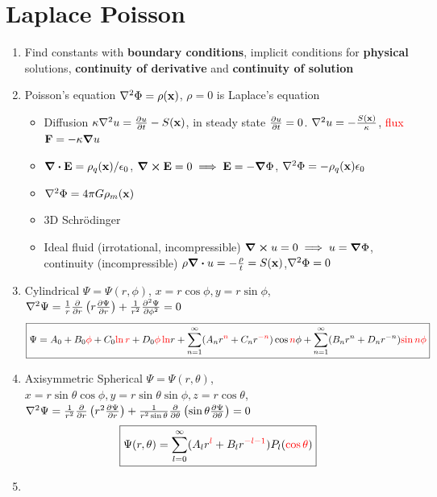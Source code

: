 \documentclass{article}
\theoremstyle{remark}
\theoremstyle{remark}
\begin{document}
    \section*{Laplace Poisson}
    \begin{enumerate}
        \item Find constants with \textbf{boundary conditions}, implicit conditions for \textbf{physical} solutions, \textbf{continuity of derivative} and \textbf{continuity of solution}
        \item Poisson's equation $\laplacian\Phi=\rho(\vb{x})$, $\rho=0$ is Laplace's equation\begin{itemize}
            \item Diffusion $\kappa\laplacian u=\pdv{u}{t}-S(\vb{x})$, in steady state $\pdv{u}{t}=0$. $\laplacian{u}=-\frac{S(\vb{x})}{\kappa}$, \textcolor{red}{flux $\vb{F}=-\kappa\grad u$}
            \item $\div\vb{E}=\rho_q(\vb{x})/\epsilon_0$, $\curl\vb{E}=0\implies\vb{E}=-\grad\Phi$, $\laplacian{\Phi}=-\rho_q(\vb{x})\epsilon_0$
            \item $\laplacian{\Phi}=4\pi G\rho_m(\vb{x})$
            \item 3D Schr\"odinger
            \item Ideal fluid (irrotational, incompressible) $\curl u=0\implies u=\grad\Phi$, continuity (incompressible) $\rho\div u=-\frac{\rho}{t}=S(\vb{x})$,$\laplacian{\Phi}=0$
        \end{itemize}
        \item Cylindrical $\Psi = \Psi(r,\phi)$, $x=r\cos\phi,y=r\sin\phi$, $\laplacian{\Psi}=\frac{1}{r}\pdv{r}\left(r\pdv{\Psi}{r}\right)+\frac{1}{r^2}\pdv[2]{\Psi}{\phi}=0$\[
            \boxed{\Psi = A_0+B_0\textcolor{red}{\phi}+C_0\textcolor{red}{\ln r}+D_0\textcolor{red}{\phi\ln} r+\sum_{n=1}^{\infty}(A_n r^{\textcolor{red}{n}}+C_n r^{\textcolor{red}{-n}})\cos \textcolor{red}{n}\phi+\sum_{n=1}^{\infty}(B_n r^n+D_n r^{-n})\textcolor{red}{\sin n\phi}}
        \]
        \item Axisymmetric Spherical $\Psi=\Psi(r,\theta)$, $x=r\sin\theta\cos\phi, y=r\sin\theta\sin\phi, z=r\cos\theta$, $\laplacian\Psi=\frac{1}{r^2}\pdv{r}\left(r^2\pdv{\Psi}{r}\right)+\frac{1}{r^2\sin\theta}\pdv{\theta}\left(\sin\theta\pdv{\Psi}{\theta}\right)=0$\[
            \boxed{\Psi(r,\theta)=\sum_{l=0}^{\infty}(A_l r^{\textcolor{red}{l}}+B_l r^{\textcolor{red}{-l-1}})P_l(\textcolor{red}{\cos\theta})}
        \]
        \item \begin{tabular}{|Sc|c|c|}

\end{tabular}
\end{enumerate}
\end{document}
